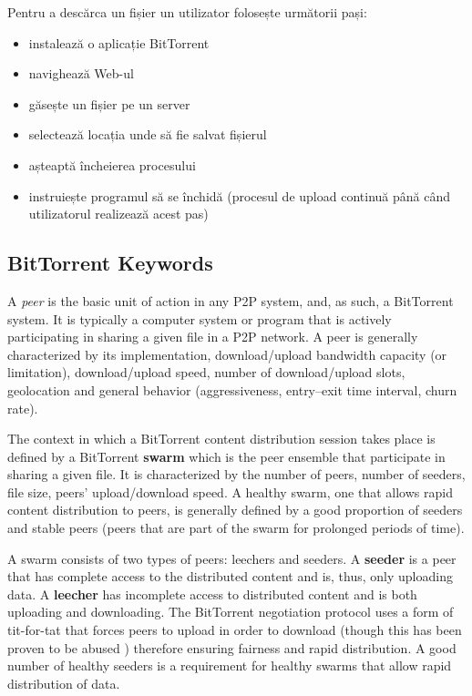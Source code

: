 Pentru a descărca un fișier un utilizator folosește următorii pași:

\begin{itemize}
  \item instalează o aplicație BitTorrent
  \item navighează Web-ul
  \item găsește un fișier pe un server
  \item selectează locația unde să fie salvat fișierul
  \item așteaptă încheierea procesului
  \item instruiește programul să se închidă (procesul de upload continuă până
  când utilizatorul realizează acest pas)
\end{itemize}

\subsection{BitTorrent Keywords}

A \textit{peer} is the basic unit of action in any P2P system, and, as such, a
BitTorrent system. It is typically a computer system or program that is
actively participating in sharing a given file in a P2P network. A peer is
generally characterized by its implementation, download/upload bandwidth
capacity (or limitation), download/upload speed, number of download/upload
slots, geolocation and general behavior (aggressiveness, entry--exit time
interval, churn rate).

The context in which a BitTorrent content distribution session takes place is
defined by a BitTorrent \textbf{swarm} which is the peer ensemble that
participate in sharing a given file. It is characterized by the number of
peers, number of seeders, file size, peers' upload/download speed. A healthy
swarm, one that allows rapid content distribution to peers, is generally
defined by a good proportion of seeders and stable peers (peers that are part
of the swarm for prolonged periods of time).

A swarm consists of two types of peers: leechers and seeders. A
\textbf{seeder} is a peer that has complete access to the distributed content
and is, thus, only uploading data. A \textbf{leecher} has incomplete access to
distributed content and is both uploading and downloading. The BitTorrent
negotiation protocol uses a form of tit-for-tat that forces peers to upload in
order to download (though this has been proven to be abused
\cite{free-riding}) therefore ensuring fairness and rapid distribution. A good
number of healthy seeders is a requirement for healthy swarms that allow rapid
distribution of data.

